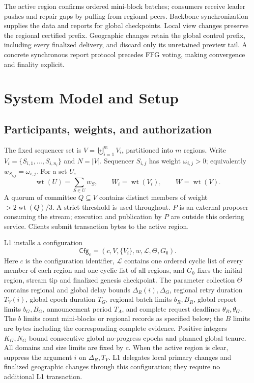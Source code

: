 \documentclass[11pt,a4paper,onecolumn]{article}
\newcommand{\Cfg}{\mathsf{Cfg}}
\newcommand{\wt}{\operatorname{wt}}
\theoremstyle{remark}\newtheorem{example}[definition]{Example}
\newcounter{protocol}
\begin{document}
The active region confirms ordered mini-block batches; consumers receive leader
pushes and repair gaps by pulling from regional peers. Backbone synchronization
supplies the data and reports for global checkpoints. Local view changes preserve
the regional certified prefix. Geographic changes retain the global control
prefix, including every finalized delivery, and discard only its unretained
preview tail. A concrete synchronous report protocol precedes FFG voting,
making convergence and finality explicit.


\section{System Model and Setup}\label{sec:model}
\subsection{Participants, weights, and authorization}
The fixed sequencer set is $V=\biguplus_{i=1}^{m}V_i$, partitioned into $m$ regions.
Write $V_i=\{S_{i,1},\ldots,S_{i,n_i}\}$ and $N=|V|$. Sequencer $S_{i,j}$ has
weight $\omega_{i,j}>0$; equivalently $w_{S_{i,j}}=\omega_{i,j}$. For a set $U$,
\[
 \wt(U)=\sum_{S\in U}w_S,\qquad W_i=\wt(V_i),\qquad W=\wt(V).
\]
A quorum of committee $Q\subseteq V$ contains distinct members of weight
$>2\wt(Q)/3$. A strict threshold is used throughout. $P$ is an external
proposer consuming the stream; execution and publication by $P$ are outside
this ordering service. Clients submit transaction bytes to the active region.

L1 installs a configuration
\begin{equation}\label{eq:cfg}
 \Cfg_c=(c,V,\{V_i\},w,\mathcal L,\Theta,G_0).
\end{equation}
Here $c$ is the configuration identifier, $\mathcal L$ contains one ordered
cyclic list of every member of each region and one cyclic list of all regions,
and $G_0$ fixes the initial region, stream tip and finalized genesis checkpoint.
The parameter collection $\Theta$ contains regional and global delay bounds
$\Delta_R(i),\Delta_G$, regional retry duration $T_V(i)$, global epoch duration
$T_G$, regional batch limits $b_R,B_R$, global report limits $b_G,B_G$,
announcement period $T_A$, and complete request deadlines $\theta_R,\theta_G$.
The $b$ limits count mini-blocks or regional records as specified below; the
$B$ limits are bytes including the corresponding complete evidence.
Positive integers $K_G,N_G$ bound consecutive global no-progress epochs and
planned global tenure. All domains and size limits are fixed by $c$.
When the active region is clear, suppress the argument $i$ on $\Delta_R,T_V$.
L1 delegates local primary changes and finalized geographic changes through
this configuration; they require no additional L1 transaction.
\end{document}
